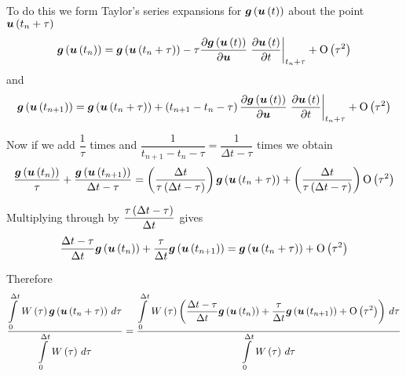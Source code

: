 To do this we form Taylor's series expansions for
$\fnof{\vect{g}}{\fnof{\vect{u}}{t}}$ about the point $\fnof{\vect{u}}{t_{n}+\tau}$ \ie
\begin{equation}
  \fnof{\vect{g}}{\fnof{\vect{u}}{t_{n}}}=\fnof{\vect{g}}{\fnof{\vect{u}}{t_{n}+\tau}}-
  \tau\delby{\fnof{\vect{g}}{\fnof{\vect{u}}{t}}}{\vect{u}}\evalat{\delby{\fnof{\vect{u}}{t}}{t}}{t_{n}+\tau}
  + \orderof{\tau^{2}}
  \label{eqn:firstTaylorexpansion}
\end{equation}
and
\begin{equation}
  \fnof{\vect{g}}{\fnof{\vect{u}}{t_{n+1}}}=\fnof{\vect{g}}{\fnof{\vect{u}}{t_{n}+\tau}}+
  \pbrac{t_{n+1}-t_{n}-\tau}\delby{\fnof{\vect{g}}{\fnof{\vect{u}}{t}}}{\vect{u}}
  \evalat{\delby{\fnof{\vect{u}}{t}}{t}}{t_{n}+\tau}+ \orderof{\tau^{2}}
  \label{eqn:secondTaylorexpansion}
\end{equation}

Now if we add $\dfrac{1}{\tau}$ times  and
$\dfrac{1}{t_{n+1}-t_{n}-\tau}=\dfrac{1}{\Delta t-\tau}$ times
 we obtain
\begin{equation}
  \dfrac{\fnof{\vect{g}}{\fnof{\vect{u}}{t_{n}}}}{\tau}+\dfrac{\fnof{\vect{g}}{\fnof{\vect{u}}{t_{n+1}}}}{\Delta
    t-\tau}=\pbrac{\dfrac{\Delta t}{\tau\pbrac{\Delta t-\tau}}}\fnof{\vect{g}}{\fnof{\vect{u}}{t_{n}+\tau}}+
  \pbrac{\dfrac{\Delta t}{\tau\pbrac{\Delta t-\tau}}}\orderof{\tau^{2}}
\end{equation}

Multiplying through by $\dfrac{\tau\left( \Delta t-\tau \right)}{\Delta t}$ gives
\begin{equation}
  \dfrac{\Delta t-\tau}{\Delta t}\fnof{\vect{g}}{\fnof{\vect{u}}{t_{n}}}+
  \dfrac{\tau}{\Delta t}\fnof{\vect{g}}{\fnof{\vect{u}}{t_{n+1}}}=
  \fnof{\vect{g}}{\fnof{\vect{u}}{t_{n}+\tau}}+\orderof{\tau^{2}}
\end{equation}

Therefore
\begin{equation}
  \dfrac{\gint{0}{\Delta t}{\fnof{W}{\tau}\fnof{\vect{g}}{\fnof{\vect{u}}{t_{n}+\tau}}}{\tau}}
  {\gint{0}{\Delta t}{\fnof{W}{\tau}}{\tau}}=\dfrac{\gint{0}{\Delta t}{\fnof{W}{\tau}
      \pbrac{\dfrac{\Delta t-\tau}{\Delta t}\fnof{\vect{g}}{\fnof{\vect{u}}{t_{n}}}+
        \dfrac{\tau}{\Delta t}\fnof{\vect{g}}{\fnof{\vect{u}}{t_{n+1}}}+\orderof{\tau^{2}}}}{\tau}}
  {\gint{0}{\Delta t}{\fnof{W}{\tau}}{\tau}}
\end{equation}

